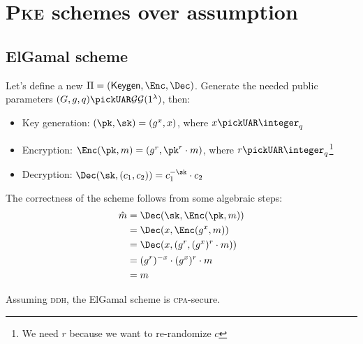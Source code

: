
\section{\textsc{Pke} schemes over \ddh{} assumption}

\subsection{ElGamal scheme}

Let's define a new $\Pi = (\keygen, \Enc, \Dec)$. Generate the needed public parameters $(G,g,q) \pickUAR \groupgen(1^{\lambda})$\footnotemark, then:


\begin{itemize}
    \item Key generation: $(\pk, \sk) = (g^x, x)$, where $x \pickUAR \integer_q$
    \item Encryption: $\Enc(\pk, m) = (g^r, \pk^r \cdot m)$, where $r \pickUAR \integer_q$\footnote{We need $r$ because we want to re-randomize $c$}
    \item Decryption: $\Dec(\sk, (c_1, c_2))= c_1^{-\sk} \cdot c_2$
\end{itemize}

The correctness of the scheme follows from some algebraic steps:
\begin{align*}
    \hat{m} &= \Dec(\sk, \Enc(\pk, m))          \\
            &= \Dec(x, \Enc(g^x, m))            \\
            &= \Dec(x, (g^r, (g^x)^r \cdot m))  \\
            &= (g^r)^{-x} \cdot (g^x)^r \cdot m \\
            &= m                                \\
\end{align*}

\begin{theorem}
    Assuming \textsc{ddh}, the ElGamal scheme is \textsc{cpa}-secure.
\end{theorem}

